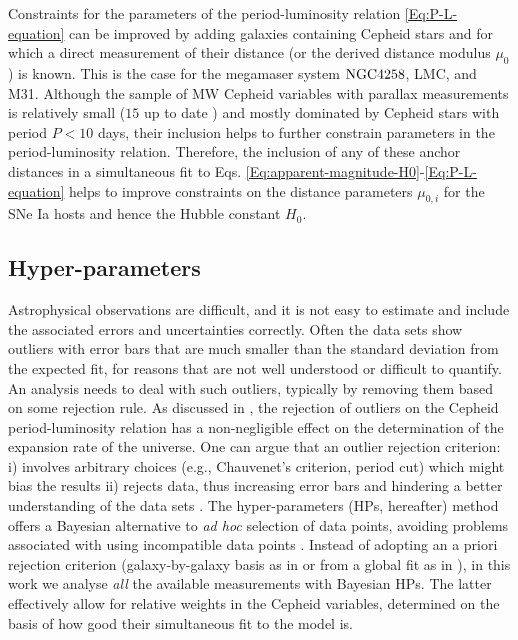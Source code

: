 Constraints for the parameters of the period-luminosity relation \eqref{Eq:P-L-equation} can be improved by adding galaxies containing Cepheid stars and for which a direct measurement of their distance (or the derived distance modulus $\mu_0$) is known. This is the case for the megamaser system $\mathrm{NGC4258}$, LMC, and M31. Although the sample of MW Cepheid variables with parallax measurements is relatively small ($15$ up to date \cite{Riess:2016jrr}) and mostly dominated by Cepheid stars with period $P<10$ days, their inclusion helps to further constrain parameters in the period-luminosity relation. Therefore, the inclusion of any of these anchor distances in a simultaneous fit to Eqs. \eqref{Eq:apparent-magnitude-H0}-\eqref{Eq:P-L-equation} helps to improve constraints on the distance parameters $\mu_{0,i}$ for the SNe Ia hosts and hence the Hubble constant $H_0$. 

\subsection{Hyper-parameters}

Astrophysical observations are difficult, and it is not easy to estimate and include the associated errors and uncertainties correctly. Often the data sets show outliers with error bars that are much smaller than the standard deviation from the expected fit, for reasons that are not well understood or difficult to quantify. An analysis needs to deal with such outliers, typically by removing them based on some rejection rule.
As discussed in \cite{Riess:2009pu,Riess:2011yx,Efstathiou:2013via}, the rejection of outliers on the Cepheid period-luminosity relation has a non-negligible effect on the determination of the expansion rate of the universe. One can argue that an outlier rejection criterion: i) involves arbitrary choices (e.g., Chauvenet's criterion, period cut) which might bias the results ii) rejects data, thus increasing error bars and hindering a better understanding of the data sets \cite{Press:1996fw}. The hyper-parameters (HPs, hereafter) method offers a Bayesian alternative to {\em{ad hoc}} selection of data points, avoiding problems associated with using incompatible data points \cite{Lahav:1999hu}. Instead of adopting an a priori rejection criterion  (galaxy-by-galaxy basis as in \cite{Riess:2009pu,Riess:2011yx} or from a global fit as in \cite{Efstathiou:2013via}), in this work we analyse {\em all} the available measurements with Bayesian HPs. The latter effectively allow for relative weights in the Cepheid variables, determined on the basis of how good their simultaneous fit to the model is. 

